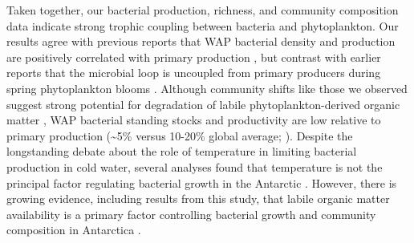 Taken together, our bacterial production, richness, and community composition data indicate strong trophic coupling between bacteria and phytoplankton. Our results agree with previous reports that WAP bacterial density and production are positively correlated with primary production \citep{Church2003-oj,Ortega-Retuerta2008-pk}, but contrast with earlier reports that the microbial loop is uncoupled from primary producers during spring phytoplankton blooms \citep{Bird1991-sx,bird1999uncoupling,Karl1991-cs,duarte2005experimental}. Although community shifts like those we observed suggest strong potential for degradation of labile phytoplankton-derived organic matter \citep{Landa2014-yg}, WAP bacterial standing stocks and productivity are low relative to primary production (\textasciitilde{}5\% versus 10-20\% global average; \citealt{dsvse12,kim2016decedal}). Despite the longstanding debate about the role of temperature in limiting bacterial production in cold water, several analyses found that temperature is not the principal factor regulating bacterial growth in the Antarctic \citep{dsvse12,thingstad1991bacteria,Kirchman2009-sg}. However, there is growing evidence, including results from this study, that labile organic matter availability is a primary factor controlling bacterial growth and community composition in Antarctica \citep{Kirchman2009-sg,dsvse12,kim2016decedal}. 


